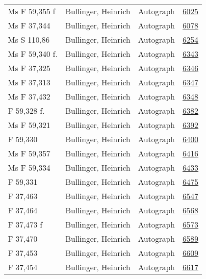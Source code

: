 \documentclass[10pt,a4paper,landscape]{report}
\begin{document}
\begin{longtable}{p{16cm}p{4cm}lr}
Ms F 59,355 f	&	Bullinger, Heinrich	&	Autograph	&	\href{http://130.60.24.72/assignment/6025}{6025}\\
Ms F 37,344	&	Bullinger, Heinrich	&	Autograph	&	\href{http://130.60.24.72/assignment/6078}{6078}\\
Ms S 110,86	&	Bullinger, Heinrich	&	Autograph	&	\href{http://130.60.24.72/assignment/6254}{6254}\\
Ms F 59,340 f.	&	Bullinger, Heinrich	&	Autograph	&	\href{http://130.60.24.72/assignment/6343}{6343}\\
Ms F 37,325	&	Bullinger, Heinrich	&	Autograph	&	\href{http://130.60.24.72/assignment/6346}{6346}\\
Ms F 37,313	&	Bullinger, Heinrich	&	Autograph	&	\href{http://130.60.24.72/assignment/6347}{6347}\\
Ms F 37,432	&	Bullinger, Heinrich	&	Autograph	&	\href{http://130.60.24.72/assignment/6348}{6348}\\
F 59,328 f.	&	Bullinger, Heinrich	&	Autograph	&	\href{http://130.60.24.72/assignment/6382}{6382}\\
Ms F 59,321	&	Bullinger, Heinrich	&	Autograph	&	\href{http://130.60.24.72/assignment/6392}{6392}\\
F 59,330	&	Bullinger, Heinrich	&	Autograph	&	\href{http://130.60.24.72/assignment/6400}{6400}\\
Ms F 59,357	&	Bullinger, Heinrich	&	Autograph	&	\href{http://130.60.24.72/assignment/6416}{6416}\\
Ms F 59,334	&	Bullinger, Heinrich	&	Autograph	&	\href{http://130.60.24.72/assignment/6433}{6433}\\
F 59,331	&	Bullinger, Heinrich	&	Autograph	&	\href{http://130.60.24.72/assignment/6475}{6475}\\
F 37,463	&	Bullinger, Heinrich	&	Autograph	&	\href{http://130.60.24.72/assignment/6547}{6547}\\
F 37,464	&	Bullinger, Heinrich	&	Autograph	&	\href{http://130.60.24.72/assignment/6568}{6568}\\
F 37,473 f	&	Bullinger, Heinrich	&	Autograph	&	\href{http://130.60.24.72/assignment/6573}{6573}\\
F 37,470	&	Bullinger, Heinrich	&	Autograph	&	\href{http://130.60.24.72/assignment/6589}{6589}\\
F 37,453	&	Bullinger, Heinrich	&	Autograph	&	\href{http://130.60.24.72/assignment/6609}{6609}\\
F 37,454	&	Bullinger, Heinrich	&	Autograph	&	\href{http://130.60.24.72/assignment/6617}{6617}\\

\end{longtable}
\end{document}

